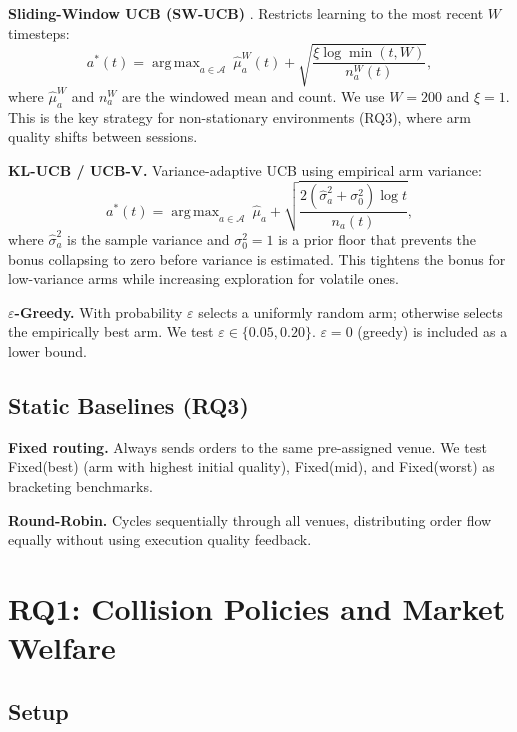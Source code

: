 \documentclass[11pt]{article}
\DeclareMathOperator*{\argmax}{arg\,max}
\begin{document}
\textbf{Sliding-Window UCB (SW-UCB)} \citep{garivier2011}.
Restricts learning to the most recent $W$ timesteps:
\begin{equation}
  a^*(t) = \argmax_{a \in \mathcal{A}}\ \hat{\mu}_a^W(t) + \sqrt{\frac{\xi \log \min(t, W)}{n_a^W(t)}},
\end{equation}
where $\hat{\mu}_a^W$ and $n_a^W$ are the windowed mean and count.
We use $W = 200$ and $\xi = 1$.
This is the key strategy for non-stationary environments (RQ3), where arm
quality shifts between sessions.

\textbf{KL-UCB / UCB-V.}
Variance-adaptive UCB using empirical arm variance:
\begin{equation}
  a^*(t) = \argmax_{a \in \mathcal{A}}\ \hat{\mu}_a + \sqrt{\frac{2(\hat{\sigma}_a^2 + \sigma_0^2)\log t}{n_a(t)}},
\end{equation}
where $\hat{\sigma}_a^2$ is the sample variance and $\sigma_0^2 = 1$ is a
prior floor that prevents the bonus collapsing to zero before variance is
estimated. This tightens the bonus for low-variance arms while increasing
exploration for volatile ones.

\textbf{$\varepsilon$-Greedy.}
With probability $\varepsilon$ selects a uniformly random arm; otherwise
selects the empirically best arm. We test $\varepsilon \in \{0.05, 0.20\}$.
$\varepsilon = 0$ (greedy) is included as a lower bound.

\subsection{Static Baselines (RQ3)}

\textbf{Fixed routing.} Always sends orders to the same pre-assigned
venue. We test Fixed(best) (arm with highest initial quality), Fixed(mid),
and Fixed(worst) as bracketing benchmarks.

\textbf{Round-Robin.} Cycles sequentially through all venues, distributing
order flow equally without using execution quality feedback.

\section{RQ1: Collision Policies and Market Welfare}
\label{sec:rq1}

\subsection{Setup}
\end{document}
